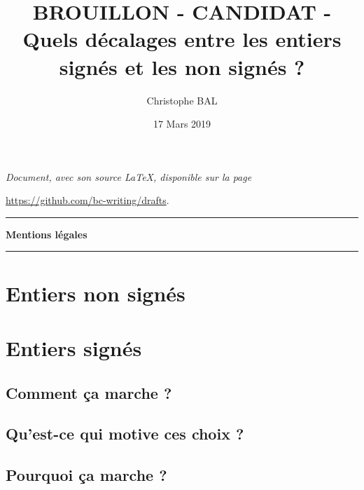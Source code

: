 \documentclass[12pt]{amsart}
\begin{document}
\title{BROUILLON - CANDIDAT - Quels décalages entre les entiers signés et les non signés ?}
\author{Christophe BAL}
\date{17 Mars 2019}

\maketitle

\begin{center}
	\itshape
	Document, avec son source \LaTeX, disponible sur la page
	
	\url{https://github.com/bc-writing/drafts}.
\end{center}


\bigskip


\begin{center}
	\hrule\vspace{.3em}
	{
		\fontsize{1.35em}{1em}\selectfont
		\textbf{Mentions \og légales \fg}
	}
			
	\vspace{0.45em}
	\doclicenseThis
	\hrule
\end{center}

	
\bigskip
\setcounter{tocdepth}{2}
\tableofcontents




\section{Entiers non signés}






\section{Entiers signés}

\subsection{Comment ça marche ?}




\subsection{Qu'est-ce qui motive ces choix ?}




\subsection{Pourquoi ça marche ?}
\end{document}
